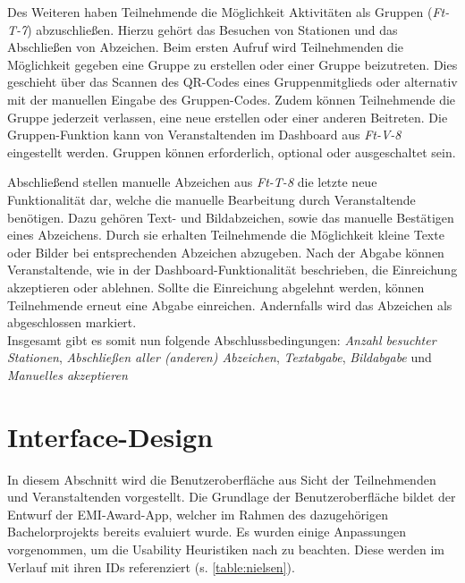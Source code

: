 Des Weiteren haben Teilnehmende die Möglichkeit Aktivitäten als Gruppen
(\textit{Ft-T-7}) abzuschließen. Hierzu gehört das Besuchen von Stationen und
das Abschließen von Abzeichen. Beim ersten Aufruf wird Teilnehmenden die
Möglichkeit gegeben eine Gruppe zu erstellen oder einer Gruppe beizutreten. Dies
geschieht über das Scannen des QR-Codes eines Gruppenmitglieds oder alternativ
mit der manuellen Eingabe des Gruppen-Codes. Zudem können Teilnehmende die
Gruppe jederzeit verlassen, eine neue erstellen oder einer anderen Beitreten.
Die Gruppen-Funktion kann von Veranstaltenden im Dashboard aus \textit{Ft-V-8}
eingestellt werden. Gruppen können erforderlich, optional oder ausgeschaltet
sein.

Abschließend stellen manuelle Abzeichen aus \textit{Ft-T-8} die letzte neue
Funktionalität dar, welche die manuelle Bearbeitung durch Veranstaltende
benötigen. Dazu gehören Text- und Bildabzeichen, sowie das manuelle Bestätigen
eines Abzeichens. Durch sie erhalten Teilnehmende die Möglichkeit kleine Texte
oder Bilder bei entsprechenden Abzeichen abzugeben. Nach der Abgabe können
Veranstaltende, wie in der Dashboard-Funktionalität beschrieben, die Einreichung
akzeptieren oder ablehnen. Sollte die Einreichung abgelehnt werden, können
Teilnehmende erneut eine Abgabe einreichen. Andernfalls wird das Abzeichen als
abgeschlossen markiert. \\
Insgesamt gibt es somit nun folgende Abschlussbedingungen: \textit{Anzahl
    besuchter Stationen}, \textit{Abschließen aller (anderen) Abzeichen},
\textit{Textabgabe}, \textit{Bildabgabe} und \textit{Manuelles akzeptieren}

\section{Interface-Design}

In diesem Abschnitt wird die Benutzeroberfläche aus Sicht der Teilnehmenden und
Veranstaltenden vorgestellt. Die Grundlage der Benutzeroberfläche bildet der
Entwurf der EMI-Award-App, welcher im Rahmen des dazugehörigen Bachelorprojekts
bereits evaluiert wurde. Es wurden einige Anpassungen vorgenommen, um die
Usability Heuristiken nach \textcite{Nielsen1994} zu beachten. Diese
werden im Verlauf mit ihren IDs referenziert (s. \autoref{table:nielsen}).

